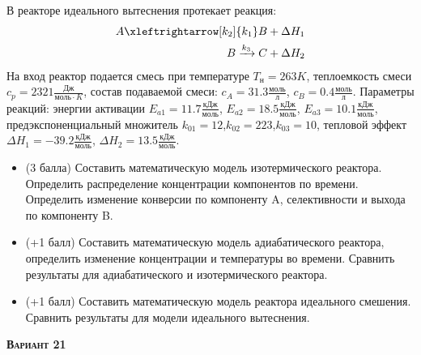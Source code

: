  В реакторе идеального вытеснения протекает реакция: \begin{equation*} \begin{aligned} A \xleftrightarrow[k_2]{k_1} B + \Delta H_1 \\ B \xrightarrow{k_3} C + \Delta H_2 \end{aligned} \end{equation*}                                      На вход  реактор подается смесь при температуре $ T_н =  263 K$, теплоемкость смеси $c_p= 2321 \frac{Дж}{моль \cdot K}$, состав подаваемой смеси: $c_A=31.3 \frac{моль}{л}$, $c_B=0.4 \frac{моль}{л}$. Параметры реакций: энергии активации $E_{a1}=11.7 \frac{кДж}{моль}$, $E_{a2}=18.5  \frac{кДж}{моль}$, $E_{a3}=10.1  \frac{кДж}{моль}$, предэкспоненциальный множитель $k_{01}=        12$,$k_{02}=       223$,$k_{03}=        10$, тепловой эффект $\Delta H_1= -39.2  \frac{кДж}{моль}$, $\Delta H_2=13.5 \frac{кДж}{моль}$.\begin{itemize} \item (3 балла) Составить математическую модель изотермического реактора. Определить распределение концентрации компонентов по времени. Определить изменение конверсии по компоненту A, селективности и выхода по компоненту B. \item (+1 балл) Составить математическую модель адиабатического реактора, определить изменение концентрации и температуры во времени. Сравнить результаты для адиабатического и изотермического реактора. \item (+1 балл) Составить математическую модель реактора идеального смешения. Сравнить результаты для модели идеального вытеснения. \end{itemize}

\textsc{\textbf{Вариант 21}}

